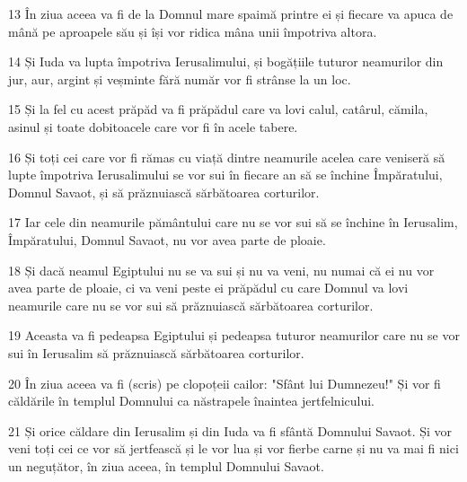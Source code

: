 \par 13 În ziua aceea va fi de la Domnul mare spaimă printre ei și fiecare va apuca de mână pe aproapele său și își vor ridica mâna unii împotriva altora.
\par 14 Și Iuda va lupta împotriva Ierusalimului, și bogățiile tuturor neamurilor din jur, aur, argint și veșminte fără număr vor fi strânse la un loc.
\par 15 Și la fel cu acest prăpăd va fi prăpădul care va lovi calul, catârul, cămila, asinul și toate dobitoacele care vor fi în acele tabere.
\par 16 Și toți cei care vor fi rămas cu viață dintre neamurile acelea care veniseră să lupte împotriva Ierusalimului se vor sui în fiecare an să se închine Împăratului, Domnul Savaot, și să prăznuiască sărbătoarea corturilor.
\par 17 Iar cele din neamurile pământului care nu se vor sui să se închine în Ierusalim, Împăratului, Domnul Savaot, nu vor avea parte de ploaie.
\par 18 Și dacă neamul Egiptului nu se va sui și nu va veni, nu numai că ei nu vor avea parte de ploaie, ci va veni peste ei prăpădul cu care Domnul va lovi neamurile care nu se vor sui să prăznuiască sărbătoarea corturilor.
\par 19 Aceasta va fi pedeapsa Egiptului și pedeapsa tuturor neamurilor care nu se vor sui în Ierusalim să prăznuiască sărbătoarea corturilor.
\par 20 În ziua aceea va fi (scris) pe clopoțeii cailor: "Sfânt lui Dumnezeu!" Și vor fi căldările în templul Domnului ca năstrapele înaintea jertfelnicului.
\par 21 Și orice căldare din Ierusalim și din Iuda va fi sfântă Domnului Savaot. Și vor veni toți cei ce vor să jertfească și le vor lua și vor fierbe carne și nu va mai fi nici un neguțător, în ziua aceea, în templul Domnului Savaot.



